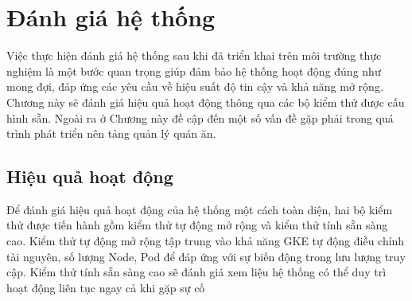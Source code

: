 \chapter{Đánh giá hệ thống}\label{chap4}
Việc thực hiện đánh giá hệ thống sau khi đã triển khai trên môi trường thực nghiệm là một bước quan trọng giúp đảm bảo hệ thống hoạt động đúng như mong đợi, đáp ứng các yêu cầu về hiệu suất độ tin cậy và khả năng mở rộng.
Chương này sẽ đánh giá hiệu quả hoạt động thông qua các bộ kiểm thử được cấu hình sẵn.
Ngoài ra ở Chương này đề cập đến một số vấn đề gặp phải trong quá trình phát triển nên tảng quản lý quán ăn.
\section{Hiệu quả hoạt động}\label{sec:efficiency}
Để đánh giá hiệu quả hoạt động của hệ thống một cách toàn diện, hai bộ kiểm thử được tiến hành gồm kiểm thử tự động mở rộng và kiểm thử tính sẵn sàng cao.
Kiểm thử tự động mở rộng tập trung vào khả năng GKE tự động điều chỉnh tài nguyên, số lượng Node, Pod để đáp ứng với sự biến động trong lưu lượng truy cập.
Kiểm thử tính sẵn sàng cao sẽ đánh giá xem liệu hệ thống có thể duy trì hoạt động liên tục ngay cả khi gặp sự cố
